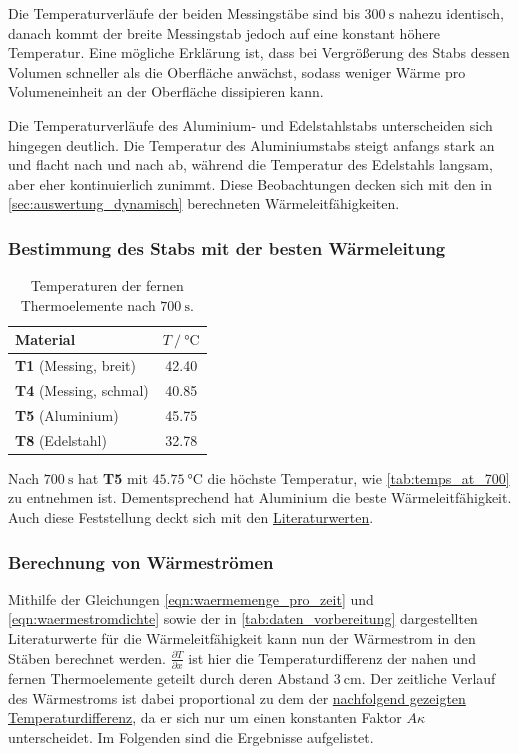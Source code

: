 Die Temperaturverläufe der beiden Messingstäbe sind bis $\SI{300}{\second}$ nahezu identisch,
danach kommt der breite Messingstab jedoch auf eine konstant höhere Temperatur.
Eine mögliche Erklärung ist,
dass bei Vergrößerung des Stabs dessen Volumen schneller als die Oberfläche anwächst,
sodass weniger Wärme pro Volumeneinheit an der Oberfläche dissipieren kann.

Die Temperaturverläufe des Aluminium- und Edelstahlstabs
unterscheiden sich hingegen deutlich.
Die Temperatur des Aluminiumstabs steigt anfangs stark an und flacht nach und nach ab,
während die Temperatur des Edelstahls langsam, aber eher kontinuierlich zunimmt.
Diese Beobachtungen decken sich mit den in \autoref{sec:auswertung_dynamisch} berechneten Wärmeleitfähigkeiten.


\subsubsection{Bestimmung des Stabs mit der besten Wärmeleitung}

\begin{table}[H]
  \centering
  \caption{Temperaturen der fernen Thermoelemente nach $\SI{700}{\second}$.}
  \label{tab:temps_at_700}
  \begin{tabular}{l S}
  \toprule
  Material &
  $T \mathbin{/} \si{\celsius}$ \\
  \midrule
  \textbf{T1} (Messing, breit)  & 42.40 \\
  \textbf{T4} (Messing, schmal) & 40.85 \\
  \textbf{T5} (Aluminium)       & 45.75 \\
  \textbf{T8} (Edelstahl)       & 32.78 \\
  \bottomrule
  \end{tabular}
\end{table}

Nach $\SI{700}{\second}$ hat \textbf{T5} mit $\SI{45.75}{\celsius}$ die höchste Temperatur,
wie \autoref{tab:temps_at_700} zu entnehmen ist.
Dementsprechend hat Aluminium die beste Wärmeleitfähigkeit.
Auch diese Feststellung deckt sich mit den \hyperref[tab:daten_vorbereitung]{Literaturwerten}.


\subsubsection{Berechnung von Wärmeströmen}

Mithilfe der Gleichungen \eqref{eqn:waermemenge_pro_zeit} und \eqref{eqn:waermestromdichte}
sowie der in \autoref{tab:daten_vorbereitung} dargestellten Literaturwerte für die Wärmeleitfähigkeit
kann nun der Wärmestrom in den Stäben berechnet werden.
$\frac{\partial T}{\partial x}$ ist hier die Temperaturdifferenz der nahen und fernen Thermoelemente geteilt durch deren Abstand $\SI{3}{\centi\meter}$.
Der zeitliche Verlauf des Wärmestroms ist dabei proportional zu dem der \hyperref[fig:statisch_tdiff]{nachfolgend gezeigten Temperaturdifferenz},
da er sich nur um einen konstanten Faktor $A \kappa$ unterscheidet.
Im Folgenden sind die Ergebnisse aufgelistet.

